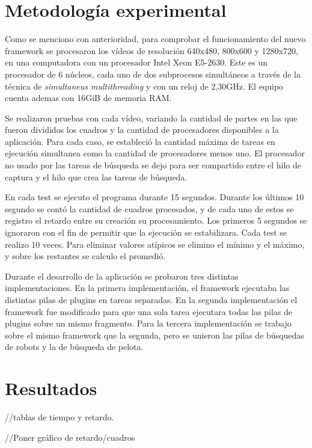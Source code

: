 
\section{Metodología experimental}

Como se menciono con anterioridad, para comprobar el funcionamiento del nuevo
framework se procesaron los vídeos de resolución 640x480, 800x600 y 1280x720, en
una computadora con un procesador Intel Xeon E5-2630. Este es un procesador de 6
núcleos, cada uno de dos subprocesos simultáneos a través de la técnica de
\emph{simultaneus multithreading} y con un reloj de 2,30GHz. El equipo cuenta
ademas con 16GiB de memoria RAM.

Se realizaron pruebas con cada vídeo, variando la cantidad de partes en las que
fueron divididos los cuadros y la cantidad de procesadores disponibles a la
aplicación. Para cada caso, se estableció la cantidad máxima de tareas en
ejecución simultanea como la cantidad de procesadores menos uno. El procesador
no usado por las tareas de búsqueda se dejo para ser compartido entre el hilo de
captura y el hilo que crea las tareas de búsqueda.

En cada test se ejecuto el programa durante 15 segundos. Durante los últimos 10
segundo se contó la cantidad de cuadros procesados, y de cada uno de estos se
registro el retardo entre su creación su procesamiento. Los primeros 5 segundos
se ignoraron con el fin de permitir que la ejecución se estabilizara.  Cada test
se realizo 10 veces. Para eliminar valores atípicos se elimino el mínimo y el
máximo, y sobre los restantes se calculo el promedió.

Durante el desarrollo de la aplicación se probaron tres distintas
implementaciones. En la primera implementación, el framework ejecutaba las
distintas pilas de plugins en tareas separadas. En la segunda implementación el
framework fue modificado para que una sola tarea ejecutara todas las pilas de
plugins sobre un mismo fragmento. Para la tercera implementación se trabajo
sobre el mismo framework que la segunda, pero se unieron las pilas de búsquedas
de robots y la de búsqueda de pelota.

\section{Resultados}

//tablas de tiempo y retardo.

//Poner gráfico de retardo/cuadros

